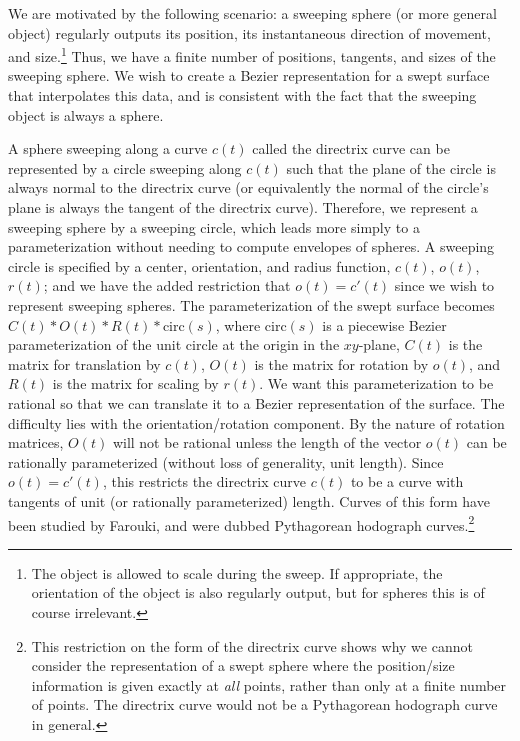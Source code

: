 We are motivated by the following scenario:
a sweeping sphere (or more general object) regularly outputs its position,
its instantaneous direction of movement, 
and size.\footnote{The object is allowed to scale during the sweep.
	If appropriate, the orientation of the object is also
	regularly output, but for spheres this is of course irrelevant.}
Thus, we have a finite number of positions, tangents, and sizes of 
the sweeping sphere.
We wish to create a Bezier representation for a swept surface
that interpolates this data, and is consistent with the fact
that the sweeping object is always a sphere.

A sphere sweeping along a curve $c(t)$ called the directrix curve
can be represented by a circle sweeping along $c(t)$ such
that the plane of the circle is always normal to the directrix
curve (or equivalently the normal of the circle's plane is
always the tangent of the directrix curve).
Therefore, we represent a sweeping sphere by a sweeping circle,
which leads more simply to a parameterization without needing to compute
envelopes of spheres.
A sweeping circle is specified by a center, orientation, and radius
function, $c(t)$, $o(t)$, $r(t)$; and 
we have the added restriction that $o(t) = c'(t)$
since we wish to represent sweeping spheres.
The parameterization of the swept surface becomes
$C(t)*O(t)*R(t)*\mbox{circ}(s)$,
where $\mbox{circ}(s)$ is a piecewise Bezier parameterization 
of the unit circle at the origin in the $xy$-plane,
$C(t)$ is the matrix for translation by $c(t)$,
$O(t)$ is the matrix for rotation by $o(t)$,
and $R(t)$ is the matrix for scaling by $r(t)$.
We want this parameterization to be rational so that we can translate
it to a Bezier representation of the surface.
The difficulty lies with the orientation/rotation component.
By the nature of rotation matrices,
$O(t)$ will not be rational unless the length of the vector 
$o(t)$ can be rationally parameterized
(without loss of generality, unit length).
Since $o(t) = c'(t)$, this restricts the directrix curve $c(t)$ to
be a curve with tangents of unit (or rationally parameterized) length.
Curves of this form have been studied by Farouki, and were
dubbed Pythagorean hodograph curves.\footnote{This restriction on the
	form of the directrix curve shows why we cannot 
	consider the representation of a swept sphere
	where the position/size information is 
	given exactly at {\em all} points, rather than only at a finite
	number of points.  The directrix curve would not
	be a Pythagorean hodograph curve in general.}


